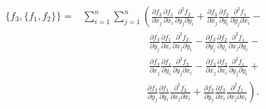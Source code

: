 \begin{align}\begin{split}
    \{f_3, \{f_1, f_2\}\}
    = &\sum_{i=1}^{n} \sum_{j=1}^{n} \left(
        \frac{\partial f_3}{\partial x_j}
        \frac{\partial f_1}{\partial x_i}
        \frac{\partial^2 f_2}{\partial y_j \partial y_i} +
        \frac{\partial f_3}{\partial x_j}
        \frac{\partial f_2}{\partial y_i}
        \frac{\partial^2 f_1}{\partial y_j \partial x_i} - \right.\\
        &\phantom{\sum_{i=1}^{n} \sum_{j=1}^{n}}\ \ \ 
        \frac{\partial f_3}{\partial y_j}
        \frac{\partial f_1}{\partial x_i}
        \frac{\partial^2 f_2}{\partial x_j \partial y_i} - 
        \frac{\partial f_3}{\partial y_j}
        \frac{\partial f_2}{\partial y_i}
        \frac{\partial^2 f_1}{\partial x_j \partial y_i} - \\
        &\phantom{\sum_{i=1}^{n} \sum_{j=1}^{n}}\ \ \ 
        \frac{\partial f_3}{\partial x_j}
        \frac{\partial f_1}{\partial y_i}
        \frac{\partial^2 f_2}{\partial y_j \partial x_i} -
        \frac{\partial f_3}{\partial x_j}
        \frac{\partial f_2}{\partial x_i}
        \frac{\partial^2 f_1}{\partial y_j \partial y_i} + \\
        &\phantom{\sum_{i=1}^{n} \sum_{j=1}^{n}}\ \ \left.
        \frac{\partial f_3}{\partial y_j}
        \frac{\partial f_1}{\partial y_i}
        \frac{\partial^2 f_2}{\partial x_j \partial x_i} +
        \frac{\partial f_3}{\partial y_j}
        \frac{\partial f_2}{\partial x_i}
        \frac{\partial^2 f_1}{\partial x_j \partial x_i}
    \right).
\end{split}\end{align}
